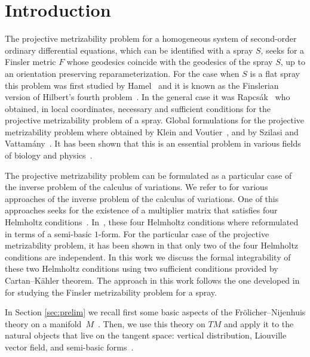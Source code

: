 \documentclass[pdftex]{sigma}
\numberwithin{equation}{section}
\begin{document}




\section{Introduction}

The projective metrizability problem for a homogeneous system of
second-order ordinary dif\/fe\-ren\-tial equations, which can be identif\/ied
with a spray $S$, seeks for a
Finsler metric $F$ whose geodesics coincide with the geodesics of
the spray $S$, up to an orientation preserving
repara\-me\-te\-rization. For the case when $S$ is a f\/lat spray this problem
was f\/irst studied by Hamel~\cite{hamel03}  and it is known as the Finslerian version of
Hilbert's fourth problem~\cite{paiva05, crampin08, szilasi07}. In the
general case it was Rapcs\'ak~\cite{rapcsak62} who obtained, in
local coordinates, necessary and suf\/f\/icient conditions for the
projective metrizability problem of a spray. Global formulations for the
projective metrizability problem where obtained by Klein and Voutier~\cite{klein68}, and by Szilasi and Vattam\'any~\cite{szilasi02}. It has
been shown that this is an essential problem in various f\/ields of
biology and physics~\cite{aim93}.

The projective metrizability problem can be formulated as a particular case of the inverse
problem of the calculus of variations. We refer to \cite{anderso92, crampin81, krupkova07, morandi90, sarlet82} for various approaches of
the inverse problem of the calculus of variations. One of this
approaches seeks for the existence of a multiplier matrix that
satisf\/ies four Helmholtz conditions~\cite{krupkova07, sarlet82}. In~\cite{bucataru09},
these four Helmholtz conditions where reformulated in terms of a
semi-basic $1$-form. For the particular case of the projective
metrizability problem, it has been shown in \cite{bucataru09} that
only two of the four Helmholtz conditions are independent. In this
work we discuss the formal integrability of these two Helmholtz
conditions using two suf\/f\/icient conditions provided by Cartan--K\"ahler
theorem. The approach in this work follows the one developed in~\cite{muzsnay06} for studying the Finsler metrizability problem for a spray.

In Section \ref{sec:prelim} we recall f\/irst some basic aspects of the Fr\"olicher--Nijenhuis
theory on a mani\-fold~$M$~\cite{frolicher56, KMS93}. Then, we use this
theory on $TM$ and apply it to the natural objects that live on the
tangent space: vertical distribution, Liouville vector f\/ield, and
semi-basic forms~\mbox{\cite{grifone72, grifone00, deleon89}}.
\end{document}
